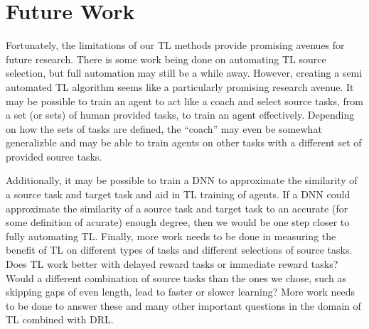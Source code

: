 \documentclass{llncs}
\begin{document}
\section{Future Work}

Fortunately, the limitations of our TL methods provide promising avenues for future research. 
There is some work being done on automating TL source selection, but full automation may still be a while away. 
However, creating a semi automated TL algorithm seems like a particularly promising research avenue. 
It may be possible to train an agent to act like a coach and select source tasks, from a set (or sets) of human provided tasks, to train an agent effectively. 
Depending on how the sets of tasks are defined, the ``coach'' may even be somewhat generalizble and may be able to train agents on other tasks with a different set of provided source tasks. 

Additionally, it may be possible to train a DNN to approximate the similarity of a source task and target task and aid in TL training of agents. 
If a DNN could approximate the similarity of a source task and target task to an accurate (for some definition of acurate) enough degree, then we would be one step closer to fully automating TL.
Finally, more work needs to be done in measuring the benefit of TL on different types of tasks and different selections of source tasks.
Does TL work better with delayed reward tasks or immediate reward tasks?
Would a different combination of source tasks than the ones we chose, such as skipping gaps of even length, lead to faster or slower learning?
More work needs to be done to answer these and many other important questions in the domain of TL combined with DRL. 


%
%
\newpage{}



\end{document}
